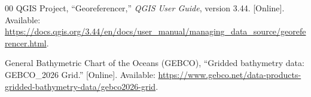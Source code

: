 \documentclass[conference]{IEEEtran}
\begin{document}
\begin{thebibliography}{00}
QGIS Project, ``Georeferencer,'' \emph{QGIS User Guide}, version 3.44. [Online]. Available: \url{https://docs.qgis.org/3.44/en/docs/user_manual/managing_data_source/georeferencer.html}.

General Bathymetric Chart of the Oceans (GEBCO), ``Gridded bathymetry data: GEBCO\_2026 Grid.'' [Online]. Available: \url{https://www.gebco.net/data-products-gridded-bathymetry-data/gebco2026-grid}.
\end{thebibliography}
\end{document}
